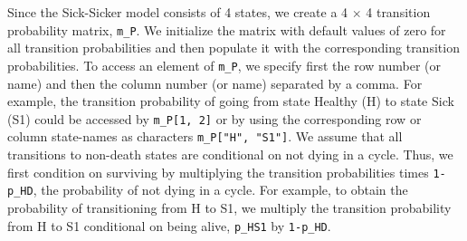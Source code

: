 \documentclass[
]{article}
\begin{document}
Since the Sick-Sicker model consists of 4 states, we create a 4 \(\times\) 4 transition probability matrix, \texttt{m\_P}. We initialize the matrix with default values of zero for all transition probabilities and then populate it with the corresponding transition probabilities. To access an element of \texttt{m\_P}, we specify first the row number (or name) and then the column number (or name) separated by a comma. For example, the transition probability of going from state Healthy (H) to state Sick (S1) could be accessed by \texttt{m\_P{[}1,\ 2{]}} or by using the corresponding row or column state-names as characters \texttt{m\_P{[}"H",\ "S1"{]}}. We assume that all transitions to non-death states are conditional on not dying in a cycle. Thus, we first condition on surviving by multiplying the transition probabilities times \texttt{1-p\_HD}, the probability of not dying in a cycle. For example, to obtain the probability of transitioning from H to S1, we multiply the transition probability from H to S1 conditional on being alive, \texttt{p\_HS1} by \texttt{1-p\_HD}.
\end{document}
